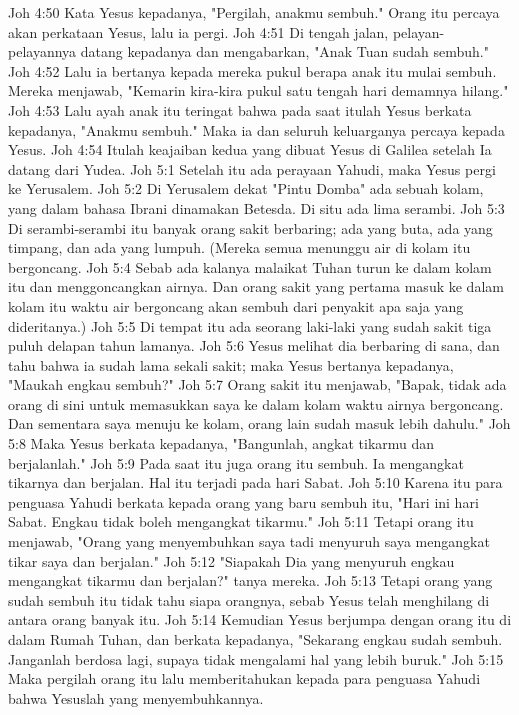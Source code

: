 Joh 4:50  Kata Yesus kepadanya, "Pergilah, anakmu sembuh." Orang itu percaya akan perkataan Yesus, lalu ia pergi.
Joh 4:51  Di tengah jalan, pelayan-pelayannya datang kepadanya dan mengabarkan, "Anak Tuan sudah sembuh."
Joh 4:52  Lalu ia bertanya kepada mereka pukul berapa anak itu mulai sembuh. Mereka menjawab, "Kemarin kira-kira pukul satu tengah hari demamnya hilang."
Joh 4:53  Lalu ayah anak itu teringat bahwa pada saat itulah Yesus berkata kepadanya, "Anakmu sembuh." Maka ia dan seluruh keluarganya percaya kepada Yesus.
Joh 4:54  Itulah keajaiban kedua yang dibuat Yesus di Galilea setelah Ia datang dari Yudea.
Joh 5:1  Setelah itu ada perayaan Yahudi, maka Yesus pergi ke Yerusalem.
Joh 5:2  Di Yerusalem dekat "Pintu Domba" ada sebuah kolam, yang dalam bahasa Ibrani dinamakan Betesda. Di situ ada lima serambi.
Joh 5:3  Di serambi-serambi itu banyak orang sakit berbaring; ada yang buta, ada yang timpang, dan ada yang lumpuh. (Mereka semua menunggu air di kolam itu bergoncang.
Joh 5:4  Sebab ada kalanya malaikat Tuhan turun ke dalam kolam itu dan menggoncangkan airnya. Dan orang sakit yang pertama masuk ke dalam kolam itu waktu air bergoncang akan sembuh dari penyakit apa saja yang dideritanya.)
Joh 5:5  Di tempat itu ada seorang laki-laki yang sudah sakit tiga puluh delapan tahun lamanya.
Joh 5:6  Yesus melihat dia berbaring di sana, dan tahu bahwa ia sudah lama sekali sakit; maka Yesus bertanya kepadanya, "Maukah engkau sembuh?"
Joh 5:7  Orang sakit itu menjawab, "Bapak, tidak ada orang di sini untuk memasukkan saya ke dalam kolam waktu airnya bergoncang. Dan sementara saya menuju ke kolam, orang lain sudah masuk lebih dahulu."
Joh 5:8  Maka Yesus berkata kepadanya, "Bangunlah, angkat tikarmu dan berjalanlah."
Joh 5:9  Pada saat itu juga orang itu sembuh. Ia mengangkat tikarnya dan berjalan. Hal itu terjadi pada hari Sabat.
Joh 5:10  Karena itu para penguasa Yahudi berkata kepada orang yang baru sembuh itu, "Hari ini hari Sabat. Engkau tidak boleh mengangkat tikarmu."
Joh 5:11  Tetapi orang itu menjawab, "Orang yang menyembuhkan saya tadi menyuruh saya mengangkat tikar saya dan berjalan."
Joh 5:12  "Siapakah Dia yang menyuruh engkau mengangkat tikarmu dan berjalan?" tanya mereka.
Joh 5:13  Tetapi orang yang sudah sembuh itu tidak tahu siapa orangnya, sebab Yesus telah menghilang di antara orang banyak itu.
Joh 5:14  Kemudian Yesus berjumpa dengan orang itu di dalam Rumah Tuhan, dan berkata kepadanya, "Sekarang engkau sudah sembuh. Janganlah berdosa lagi, supaya tidak mengalami hal yang lebih buruk."
Joh 5:15  Maka pergilah orang itu lalu memberitahukan kepada para penguasa Yahudi bahwa Yesuslah yang menyembuhkannya.
